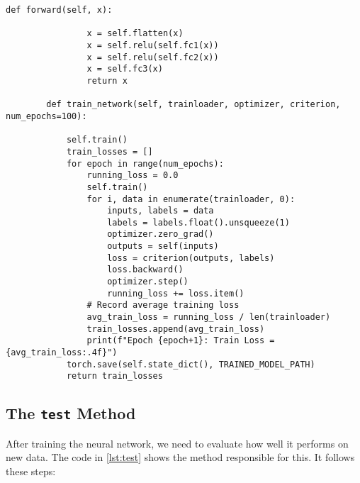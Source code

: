 \begin{minipage}{\linewidth}
    \begin{lstlisting}[caption=Forward and Train, label={lst:ForwardTrain}]
        def forward(self, x):
        
                x = self.flatten(x)
                x = self.relu(self.fc1(x))
                x = self.relu(self.fc2(x))
                x = self.fc3(x)
                return x
        
        def train_network(self, trainloader, optimizer, criterion, num_epochs=100):
                
            self.train()
            train_losses = []
            for epoch in range(num_epochs):
                running_loss = 0.0
                self.train()
                for i, data in enumerate(trainloader, 0):
                    inputs, labels = data
                    labels = labels.float().unsqueeze(1)
                    optimizer.zero_grad()
                    outputs = self(inputs)
                    loss = criterion(outputs, labels)
                    loss.backward()
                    optimizer.step()
                    running_loss += loss.item()
                # Record average training loss
                avg_train_loss = running_loss / len(trainloader)
                train_losses.append(avg_train_loss)
                print(f"Epoch {epoch+1}: Train Loss = {avg_train_loss:.4f}")
            torch.save(self.state_dict(), TRAINED_MODEL_PATH)
            return train_losses
    \end{lstlisting}
\end{minipage}
                
\subsection{The \texttt{test} Method}

After training the neural network, we need to evaluate how well it performs on new data. The code in \ref{lst:test} shows the method responsible for this. It follows these steps:

